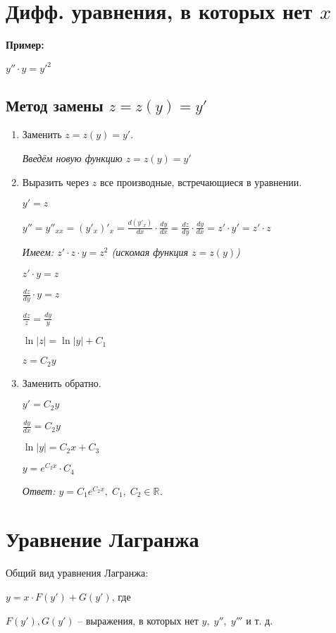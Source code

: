 \documentclass[10pt, a4paper]{article}
\begin{document}
\section{Дифф. уравнения, в которых нет $x$}
\textbf{Пример:}
\par $y'' \cdot y = y'^{2}$
\subsection{Метод замены $z = z(y) = y'$}
\begin{enumerate}
    \item Заменить $z = z(y) = y'$.
        \par\textit{Введём новую функцию $z = z(y) = y'$}
    \item Выразить через $z$ все производные, встречающиеся в уравнении.
        \par $y' = z$
        \par $y'' = y''_{xx} = (y'_{x})'_{x} = \frac{d(y'_{x})}{dx}  \cdot  \frac{dy}{dx} = \frac{dz}{dy}  \cdot  \frac{dy}{dx} = z' \cdot y' = z' \cdot z$
        \par\textit{Имеем: $z' \cdot z \cdot y = z^2$ (искомая функция $z = z(y)$)}
        \par $z' \cdot y = z$
        \par $\frac{dz}{dy} \cdot y = z$
        \par $\frac{dz}{z} = \frac{dy}{y}$
        \par $\ln|z| = \ln|y| + C_{1}$
        \par $z = C_{2}y$
    \item Заменить обратно.
        \par $y' = C_{2}y$
        \par $\frac{dy}{dx} = C_{2}y$
        \par $\ln|y| = C_{2}x + C_{3}$
        \par $y = e^{C_2{x}}  \cdot  C_4$
        \par\textit{Ответ: $y = C_1e^{C_2x},\;C_1,\;C_2 \in \mathbb{R}$.}
\end{enumerate}


\section{Уравнение Лагранжа}
Общий вид уравнения Лагранжа:
\par $y = x \cdot F(y') + G(y')$, где
\par $F(y'), G(y')$ -- выражения, в которых нет $y,\;y'',\;y'''$ и т. д.
\end{document}
